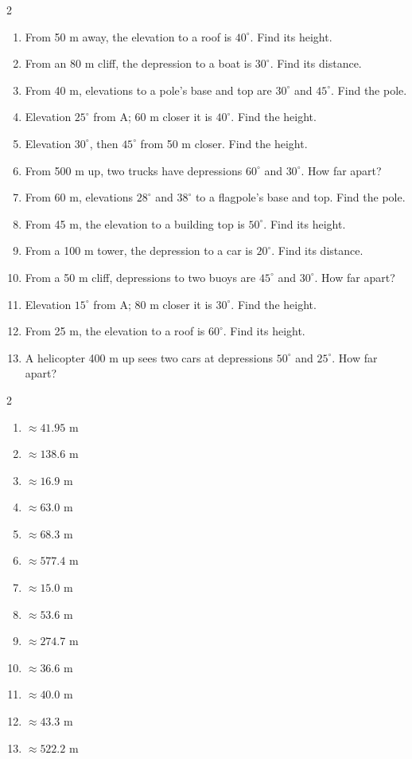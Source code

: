 \documentclass[11pt]{article}
\begin{document}
\clearpage
{}

\begin{recapbox}
\begin{multicols}{2}
\small
\begin{enumerate}[leftmargin=*,itemsep=3pt]
  \item From 50 m away, the elevation to a roof is $40^\circ$. Find its height.
  \item From an 80 m cliff, the depression to a boat is $30^\circ$. Find its distance.
  \item From 40 m, elevations to a pole's base and top are $30^\circ$ and $45^\circ$. Find the pole.
  \item Elevation $25^\circ$ from A; 60 m closer it is $40^\circ$. Find the height.
  \item Elevation $30^\circ$, then $45^\circ$ from 50 m closer. Find the height.
  \item From 500 m up, two trucks have depressions $60^\circ$ and $30^\circ$. How far apart?
  \item From 60 m, elevations $28^\circ$ and $38^\circ$ to a flagpole's base and top. Find the pole.
  \item From 45 m, the elevation to a building top is $50^\circ$. Find its height.
  \item From a 100 m tower, the depression to a car is $20^\circ$. Find its distance.
  \item From a 50 m cliff, depressions to two buoys are $45^\circ$ and $30^\circ$. How far apart?
  \item Elevation $15^\circ$ from A; 80 m closer it is $30^\circ$. Find the height.
  \item From 25 m, the elevation to a roof is $60^\circ$. Find its height.
  \item A helicopter 400 m up sees two cars at depressions $50^\circ$ and $25^\circ$. How far apart?
\end{enumerate}
\end{multicols}
\end{recapbox}

\begin{keybox}
\begin{multicols}{2}
\small
\begin{enumerate}[leftmargin=*,itemsep=3pt]
  \item $\approx41.95$ m
  \item $\approx138.6$ m
  \item $\approx16.9$ m
  \item $\approx63.0$ m
  \item $\approx68.3$ m
  \item $\approx577.4$ m
  \item $\approx15.0$ m
  \item $\approx53.6$ m
  \item $\approx274.7$ m
  \item $\approx36.6$ m
  \item $\approx40.0$ m
  \item $\approx43.3$ m
  \item $\approx522.2$ m
\end{enumerate}
\end{multicols}
\end{keybox}
\end{document}
